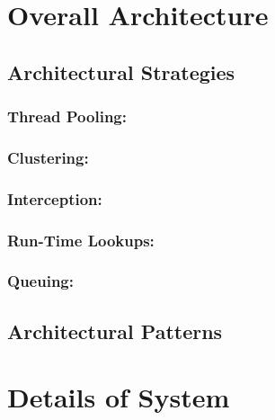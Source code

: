 \documentclass[12pt]{article}
\begin{document}
\section{Overall Architecture}



	\subsection{Architectural Strategies}
	
	

	\subsubsection {Thread Pooling:} 


	\subsubsection {Clustering:} 


	\subsubsection{Interception:}
	

	\subsubsection {Run-Time Lookups:}


	\subsubsection {Queuing:}



	\subsection{Architectural Patterns}



\section{Details of System}
\end{document}
